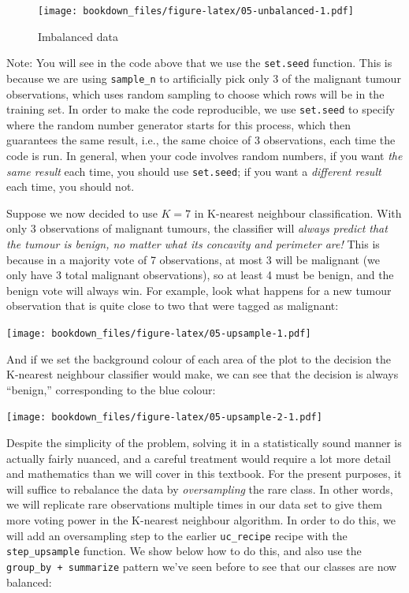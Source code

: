 \documentclass[
]{krantz}
\renewenvironment{quote}{\begin{VF}}{\end{VF}}
\begin{document}
\begin{figure}
\centering
\texttt{[image: bookdown\_files/figure-latex/05-unbalanced-1.pdf]}
\caption{\label{fig:05-unbalanced}Imbalanced data}
\end{figure}

\begin{quote}
Note: You will see in the code above that we use the \texttt{set.seed} function. This is because we are using \texttt{sample\_n} to artificially pick
only 3 of the malignant tumour observations, which uses random sampling to choose which rows will be in the training set. In order to
make the code reproducible, we use \texttt{set.seed} to specify where the random number generator starts for this
process, which then guarantees the same result, i.e., the same choice of 3 observations, each time the code is run. In general, when your
code involves random numbers, if you want \emph{the same result} each time, you should use \texttt{set.seed}; if you want a \emph{different result} each time,
you should not.
\end{quote}

Suppose we now decided to use \(K = 7\) in K-nearest neighbour classification.
With only 3 observations of malignant tumours, the classifier
will \emph{always predict that the tumour is benign, no matter what its concavity and perimeter
are!} This is because in a majority vote of 7 observations, at most 3 will be
malignant (we only have 3 total malignant observations), so at least 4 must be
benign, and the benign vote will always win. For example, look what happens for
a new tumour observation that is quite close to two that were tagged as
malignant:

\texttt{[image: bookdown\_files/figure-latex/05-upsample-1.pdf]}

And if we set the background colour of each area of the plot to the decision the K-nearest neighbour
classifier would make, we can see that the decision is always ``benign,'' corresponding to the blue colour:

\texttt{[image: bookdown\_files/figure-latex/05-upsample-2-1.pdf]}

Despite the simplicity of the problem, solving it in a statistically sound manner is actually
fairly nuanced, and a careful treatment would require a lot more detail and mathematics than we will cover in this textbook.
For the present purposes, it will suffice to rebalance the data by \emph{oversampling} the rare class.
In other words, we will replicate rare observations multiple times in our data set to give them more
voting power in the K-nearest neighbour algorithm. In order to do this, we will add an oversampling
step to the earlier \texttt{uc\_recipe} recipe with the \texttt{step\_upsample} function.
We show below how to do this, and also
use the \texttt{group\_by\ +\ summarize} pattern we've seen before to see that our classes are now balanced:
\end{document}

